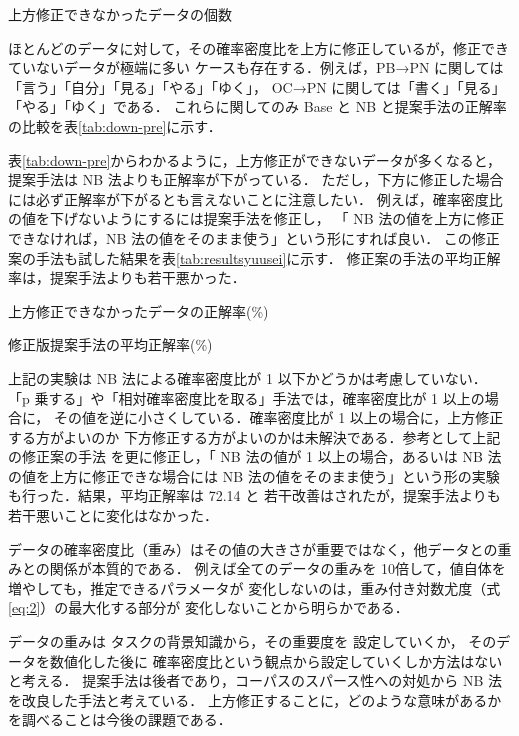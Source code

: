 \documentclass[japanese]{jnlp_1.4}
\begin{document}
\begin{table}[b]
\caption{上方修正できなかったデータの個数}
\label{tab:down}

\end{table}

ほとんどのデータに対して，その確率密度比を上方に修正しているが，修正できていないデータが極端に多い
ケースも存在する．例えば，PB→PN に関しては「言う」「自分」「見る」「やる」「ゆく」，
OC→PN に関しては「書く」「見る」「やる」「ゆく」である．
これらに関してのみ Base と NB と提案手法の正解率の比較を\mbox{表\ref{tab:down-pre}}に示す．

\mbox{表\ref{tab:down-pre}}からわかるように，上方修正ができないデータが多くなると，
提案手法は NB 法よりも正解率が下がっている．
ただし，下方に修正した場合には必ず正解率が下がるとも言えないことに注意したい．
例えば，確率密度比の値を下げないようにするには提案手法を修正し，
「 NB 法の値を上方に修正できなければ，NB 法の値をそのまま使う」という形にすれば良い．
この修正案の手法も試した結果を\mbox{表\ref{tab:resultsyuusei}}に示す．
修正案の手法の平均正解率は，提案手法よりも若干悪かった．

\begin{table}[t]
\caption{上方修正できなかったデータの正解率(\%)}
\label{tab:down-pre}

\end{table}
\begin{table}[t]
\caption{修正版提案手法の平均正解率(\%)}
\label{tab:resultsyuusei}

\end{table}

上記の実験は NB 法による確率密度比が 1 以下かどうかは考慮していない．
「p 乗する」や「相対確率密度比を取る」手法では，確率密度比が 1 以上の場合に，
その値を逆に小さくしている．確率密度比が 1 以上の場合に，上方修正する方がよいのか
下方修正する方がよいのかは未解決である．参考として上記の修正案の手法
を更に修正し，「 NB 法の値が 1 以上の場合，あるいは NB 法の値を上方に修正できな場合には
NB 法の値をそのまま使う」という形の実験も行った．結果，平均正解率は 72.14 と
若干改善はされたが，提案手法よりも若干悪いことに変化はなかった．

データの確率密度比（重み）はその値の大きさが重要ではなく，他データとの重みとの関係が本質的である．
例えば全てのデータの重みを 10倍して，値自体を増やしても，推定できるパラメータが
変化しないのは，重み付き対数尤度（\mbox{式\ref{eq:2}}）の最大化する部分が
変化しないことから明らかである．

データの重みは
タスクの背景知識から，その重要度を
設定していくか，
そのデータを数値化した後に
確率密度比という観点から設定していくしか方法はないと考える．
提案手法は後者であり，コーパスのスパース性への対処から NB 法を改良した手法と考えている．
上方修正することに，どのような意味があるかを調べることは今後の課題である．
\end{document}
